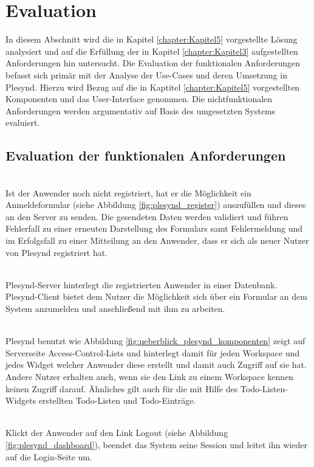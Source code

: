 \section{Evaluation}
In diesem Abschnitt wird die in Kapitel \ref{chapter:Kapitel5} vorgestellte Lösung analysiert und auf die Erfüllung der in Kapitel \ref{chapter:Kapitel3} aufgestellten Anforderungen hin untersucht. Die Evaluation der funktionalen Anforderungen befasst sich primär mit der Analyse der Use-Cases und deren Umsetzung in Plesynd. Hierzu wird Bezug auf die in Kaptitel \ref{chapter:Kapitel5} vorgestellten Komponenten und das User-Interface genommen. Die nichtfunktionalen Anforderungen werden argumentativ auf Basis des umgesetzten Systems evaluiert.

\subsection{Evaluation der funktionalen Anforderungen}

\textbullet{}  \emph{\requirementRegistrieren}\\
Ist der Anwender noch nicht registriert, hat er die Möglichkeit ein Anmeldeformular (siehe Abbildung \ref{fig:plesynd_register}) auszufüllen und dieses an den Server zu senden. Die gesendeten Daten werden validiert und führen Fehlerfall zu einer erneuten Darstellung des Formulars samt Fehlermeldung und im Erfolgsfall zu einer Mitteilung an den Anwender, dass er sich als neuer Nutzer von Plesynd registriert hat.

\textbullet{}  \emph{\requirementLogin}\\
Plesynd-Server hinterlegt die registrierten Anwender in einer Datenbank. Plesynd-Client bietet dem Nutzer die Möglichkeit sich über ein Formular an dem System anzumelden und anschließend mit ihm zu arbeiten.

\textbullet{}  \emph{\requirementZugriffAufEigeneWidgets}\\
Plesynd benutzt wie Abbildung \ref{fig:ueberblick_plesynd_komponenten} zeigt auf Serverseite Access-Control-Lists und hinterlegt damit für jeden Workspace und jedes Widget welcher Anwender diese erstellt und damit auch Zugriff auf sie hat. Andere Nutzer erhalten auch, wenn sie den Link zu einem Workspace kennen keinen Zugriff darauf. Ähnliches gilt auch für die mit Hilfe des Todo-Listen-Widgets erstellten Todo-Listen und Todo-Einträge.

\textbullet{}  \emph{\requirementLogout}\\
Klickt der Anwender auf den Link Logout (siehe Abbildung \ref{fig:plesynd_dashboard}), beendet das System seine Session und leitet ihn wieder auf die Login-Seite um. 

